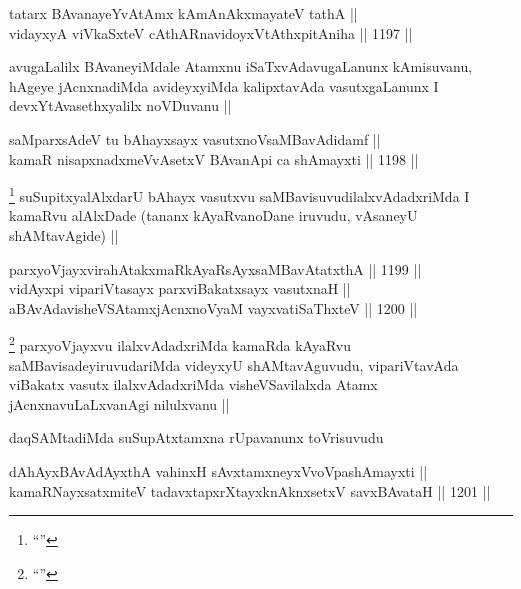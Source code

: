 
\begin{shl}
tatarx BAvanayeYvA\s \s tAmx kAmAnAkxmayateV tathA || \\
vidayxyA viVkaSxteV cAthARnavidoyxVtAthxpitAniha ||  1197 ||  
\end{shl}

\begin{artha}
avugaLalilx BAvaneyiMdale Atamxnu iSaTxvAdavugaLanunx kAmisuvanu, hAgeye jAcnxnadiMda avideyxyiMda kalipxtavAda vasutxgaLanunx I devxYtAvasethxyalilx noVDuvanu ||
\end{artha}

\begin{shl}
saMparxsAdeV tu bAhayxsayx vasutxnoV\s saMBavAdidamf || \\
kamaR nisapxnadxmeVvA\s \s setxV BAvanA\s pi ca shAmayxti ||  1198 ||  
\end{shl}

\begin{artha}
\footnote{``\stext''}
suSupitxyalAlxdarU bAhayx vasutxvu saMBavisuvudilalxvAdadxriMda I kamaRvu alAlxDade (tananx kAyaRvanoDane iruvudu, vAsaneyU shAMtavAgide) ||
\end{artha}

\begin{shl}
parxyoVjayxvirahAtakxmaRkAyaRsAyxsaMBavAtatxthA ||  1199 ||  \\
vidAyx\s pi vipariVtasayx parxviBakatxsayx vasutxnaH || \\
aBAvAdavisheVSAtamxjAcnxnoV\s yaM vayxvatiSaThxteV ||  1200 || 
\end{shl}

\begin{artha}
\footnote{``\stext''}
parxyoVjayxvu ilalxvAdadxriMda kamaRda kAyaRvu saMBavisadeyiruvudariMda videyxyU shAMtavAguvudu, vipariVtavAda viBakatx vasutx ilalxvAdadxriMda visheVSavilalxda Atamx jAcnxnavuLaLxvanAgi nilulxvanu ||
\end{artha}

\begin{artha}
daqSAMtadiMda suSupAtxtamxna rUpavanunx toVrisuvudu
\end{artha}

\begin{shl}
dAhAyxBAvAdAyxthA vahinxH sAvxtamxneyxVvoVpashAmayxti ||  \\
kamaRNayxsatxmiteV tadavxtapxrXtayxknAknxsetxV savxBAvataH ||  1201 ||  
\end{shl}

